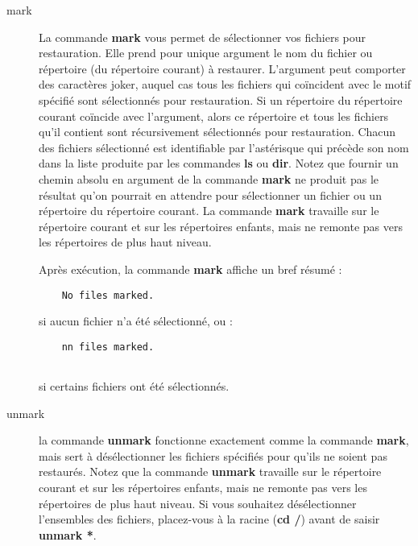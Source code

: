 \begin{description}
\item [mark]
   La commande {\bf mark} vous permet de s\'electionner vos fichiers pour restauration. 
   Elle prend pour unique argument le nom du fichier ou r\'epertoire (du r\'epertoire 
   courant) \`a restaurer. L'argument peut comporter des caract\`eres joker, auquel cas 
   tous les fichiers qui co\"incident avec le motif sp\'ecifi\'e sont s\'electionn\'es pour 
   restauration. Si un r\'epertoire du r\'epertoire courant co\"incide avec l'argument, 
   alors ce r\'epertoire et tous les fichiers qu'il contient sont r\'ecursivement 
   s\'electionn\'es pour restauration. Chacun des fichiers s\'electionn\'e est identifiable par 
   l'ast\'erisque qui pr\'ec\`ede son nom dans la liste produite par les commandes {\bf ls} 
   ou {\bf dir}. Notez que fournir un chemin absolu en argument de la commande 
   {\bf mark} ne produit pas le r\'esultat qu'on pourrait en attendre pour s\'electionner 
   un fichier ou un r\'epertoire du r\'epertoire courant. La commande {\bf mark} travaille 
   sur le r\'epertoire courant et sur les r\'epertoires enfants, mais ne remonte pas vers les 
   r\'epertoires de plus haut niveau.

   Apr\`es ex\'ecution, la commande {\bf mark} affiche un bref r\'esum\'e :

\footnotesize
\begin{verbatim}
    No files marked.    

\end{verbatim}
\normalsize

   si aucun fichier n'a \'et\'e s\'electionn\'e, ou :

\footnotesize
\begin{verbatim}
    nn files marked.
    
\end{verbatim}
\normalsize

   si certains fichiers ont \'et\'e s\'electionn\'es.

\item [unmark]
   la commande {\bf unmark} fonctionne exactement comme la commande {\bf mark}, mais 
   sert \`a d\'es\'electionner les fichiers sp\'ecifi\'es pour qu'ils ne soient pas 
   restaur\'es. Notez que la commande {\bf unmark} travaille sur le r\'epertoire courant 
   et sur les r\'epertoires enfants, mais ne remonte pas vers les r\'epertoires de plus 
   haut niveau. Si vous souhaitez d\'es\'electionner l'ensembles des fichiers, placez-vous  
   \`a la racine ({\bf cd /}) avant de saisir {\bf unmark *}.


\end{description}

